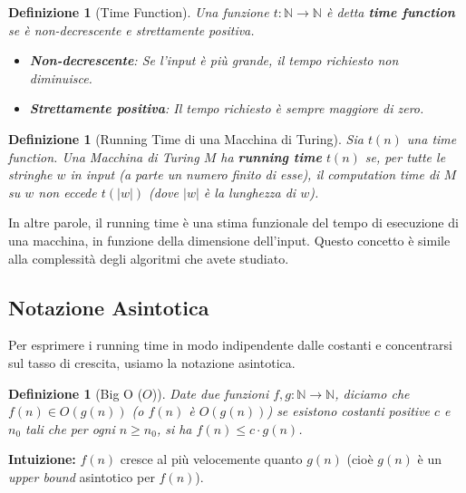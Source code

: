 \documentclass[a4paper, 11pt]{book} %
\newtheorem{definition}[theorem]{Definizione}
\theoremstyle{definition}
\begin{document}
\begin{definition}[Time Function]
Una funzione $t: \mathbb{N} \to \mathbb{N}$ è detta \textbf{time function} se è non-decrescente e strettamente positiva.
\begin{itemize}
    \item \textbf{Non-decrescente}: Se l'input è più grande, il tempo richiesto non diminuisce.
    \item \textbf{Strettamente positiva}: Il tempo richiesto è sempre maggiore di zero.
\end{itemize}
\end{definition}

\begin{definition}[Running Time di una Macchina di Turing]
Sia $t(n)$ una time function. Una Macchina di Turing $M$ ha \textbf{running time} $t(n)$ se, per tutte le stringhe $w$ in input (a parte un numero finito di esse), il computation time di $M$ su $w$ non eccede $t(|w|)$ (dove $|w|$ è la lunghezza di $w$).
\end{definition}
In altre parole, il running time è una stima funzionale del tempo di esecuzione di una macchina, in funzione della dimensione dell'input. Questo concetto è simile alla complessità degli algoritmi che avete studiato.

\subsection{Notazione Asintotica}
Per esprimere i running time in modo indipendente dalle costanti e concentrarsi sul tasso di crescita, usiamo la notazione asintotica.

\begin{definition}[Big O ($O$)]
Date due funzioni $f, g: \mathbb{N} \to \mathbb{N}$, diciamo che $f(n) \in O(g(n))$ (o $f(n)$ è $O(g(n))$) se esistono costanti positive $c$ e $n_0$ tali che per ogni $n \ge n_0$, si ha $f(n) \le c \cdot g(n)$.
\end{definition}
\textbf{Intuizione:} $f(n)$ cresce al più velocemente quanto $g(n)$ (cioè $g(n)$ è un \emph{upper bound} asintotico per $f(n)$).

\begin{center}
\end{center}
\end{document}

